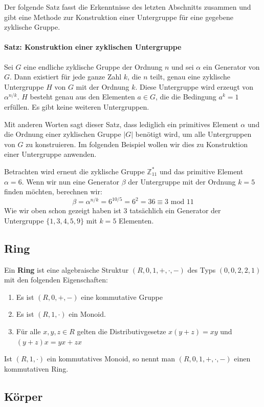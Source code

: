 Der folgende Satz fasst die Erkenntnisse des letzten Abschnitts zusammen und gibt eine Methode zur Konstruktion einer Untergruppe für eine gegebene zyklische Gruppe.

\paragraph{Satz: Konstruktion einer zyklischen Untergruppe}
Sei $G$ eine endliche zyklische Gruppe der Ordnung $n$ und sei $\alpha$ ein Generator von $G$. Dann existiert für jede ganze Zahl $k$, die $n$ teilt, genau eine zyklische Untergruppe $H$ von $G$ mit der Ordnung $k$. Diese Untergruppe wird erzeugt von $\alpha^{n/k}$. $H$ besteht genau aus den Elementen $a \in G$, die die Bedingung $a^k = 1$ erfüllen. Es gibt keine weiteren Untergruppen.

Mit anderen Worten sagt dieser Satz, dass lediglich ein primitives Element $\alpha$ und die Ordnung einer zyklischen Gruppe $|G|$ benötigt wird, um alle Untergruppen von $G$ zu konstruieren. Im folgenden Beispiel wollen wir dies zu Konstruktion einer Untergruppe anwenden.

Betrachten wird erneut die zyklische Gruppe $\mathbb{Z}^*_{11}$ und das primitive Element $\alpha = 6$. Wenn wir nun eine Generator $\beta$ der Untergruppe mit der Ordnung $k = 5$ finden möchten, berechnen wir:
$$\beta = \alpha^{n/k} = 6^{10/5} = 6^2 = 36 \equiv 3 \text{ mod } 11$$
Wie wir oben schon gezeigt haben ist $3$ tatsächlich ein Generator der Untergruppe $\{1,3,4,5,9\}$ mit $k = 5$ Elementen.

\subsection{Ring}
Ein \textbf{Ring} ist eine algebraische Struktur $(R,0,1,+,\cdot,-)$ des Typs $(0,0,2,2,1)$ mit den folgenden Eigenschaften:
\begin{enumerate}
\item Es ist $(R,0,+,-)$ eine kommutative Gruppe
\item Es ist $(R,1,\cdot)$ ein Monoid.
\item Für alle $x,y,z \in R$ gelten die Distributivgesetze $x(y+z) = xy$ und $(y+z)x = yx +zx$
\end{enumerate}
Ist $(R,1,\cdot)$ ein kommutatives Monoid, so nennt man $(R,0,1,+,\cdot,-)$ einen kommutativen Ring.

\subsection{Körper}



